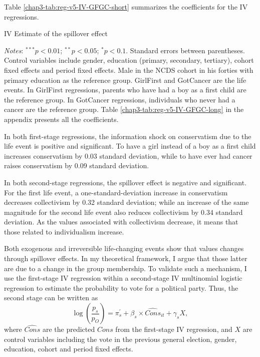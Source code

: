 Table \ref{chap3-tab:reg-v5-IV-GFGC-short} summarizes the coefficients for the IV regressions.
\begin{table}[!tb]
    \centering
    \caption{IV Estimate of the spillover effect}
    \label{chap3-tab:reg-v5-IV-GFGC-short}
    \begin{threeparttable}
        
        \begin{tablenotes}[flushleft]
            \footnotesize{\item \textit{Notes}: $^{***}p<0.01$; $^{**}p<0.05$; $^{*}p<0.1$. Standard errors between parentheses. Control variables include gender, education (primary, secondary, tertiary), cohort fixed effects and period fixed effects. Male in the NCDS cohort in his forties with primary education as the reference group. GirlFirst and GotCancer are the life events. In GirlFirst regressions, parents who have had a boy as a first child are the reference group. In GotCancer regressions, individuals who never had a cancer are the reference group. Table \ref{chap3-tab:reg-v5-IV-GFGC-long} in the appendix presents all the coefficients.}
        \end{tablenotes}
    \end{threeparttable}
\end{table}
In both first-stage regressions, the information shock on conservatism due to the life event is positive and significant. To have a girl instead of a boy as a first child increases conservatism by 0.03 standard deviation, while to have ever had cancer raises conservatism by 0.09 standard deviation.

In both second-stage regressions, the spillover effect is negative and significant. For the first life event, a one-standard-deviation increase in conservatism decreases collectivism by 0.32 standard deviation; while an increase of the same magnitude for the second life event also reduces collectivism by 0.34 standard deviation. As the values associated with collectivism decrease, it means that those related to individualism increase. 

Both exogenous and irreversible life-changing events show that values changes through spillover effects. In my theoretical framework, I argue that those latter are due to a change in the group membership. To validate such a mechanism, I use the first-stage IV regression within a second-stage IV multinomial logistic regression to estimate the probability to vote for a political party. Thus, the second stage can be written as
\begin{equation}\label{chap3-eq:est-multi2}
    \log\left(\frac{p_s}{p_O}\right) = \pi^\prime_{s} + \beta_s \times \widehat{Cons}_{it} + \gamma_{s} X,
\end{equation}
where $\widehat{Cons}$ are the predicted $Cons$ from the first-stage IV regression, and $X$ are control variables including the vote in the previous general election,  gender, education, cohort and period fixed effects.

